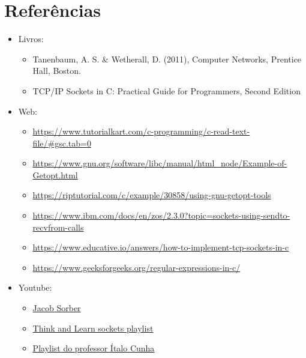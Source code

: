 \documentclass{article}
\begin{document}
\section{Referências}

\begin{itemize}
      \item Livros:
            \begin{itemize}
                  \item Tanenbaum, A. S. \& Wetherall, D. (2011), Computer
                        Networks, Prentice Hall, Boston.
                  \item TCP/IP Sockets in C\@: Practical Guide for Programmers,
                        Second Edition
            \end{itemize}

      \item Web:
            \begin{itemize}
                  \item

                        \url{https://www.tutorialkart.com/c-programming/c-read-text-file/#gsc.tab=0}
                  \item

                        \url{https://www.gnu.org/software/libc/manual/html_node/Example-of-Getopt.html}
                  \item

                        \url{https://riptutorial.com/c/example/30858/using-gnu-getopt-tools}
                  \item

                        \url{https://www.ibm.com/docs/en/zos/2.3.0?topic=sockets-using-sendto-recvfrom-calls}
                  \item

                        \url{https://www.educative.io/answers/how-to-implement-tcp-sockets-in-c}
                  \item

                        \url{https://www.geeksforgeeks.org/regular-expressions-in-c/}
            \end{itemize}

      \item Youtube:
            \begin{itemize}
                  \item \href{https://www.youtube.com/@JacobSorber}{Jacob
                              Sorber}
                  \item

                        \href{https://www.youtube.com/watch?v=_lQ-3S4fJ0U&list=PLPyaR5G9aNDvs6TtdpLcVO43_jvxp4emI}{Think
                              and Learn sockets playlist}
                  \item

                        \href{https://www.youtube.com/watch?v=tJ3qNtv0HVs&t=2s}{Playlist do professor
                              Ítalo Cunha}
            \end{itemize}

\end{itemize}
\end{document}
